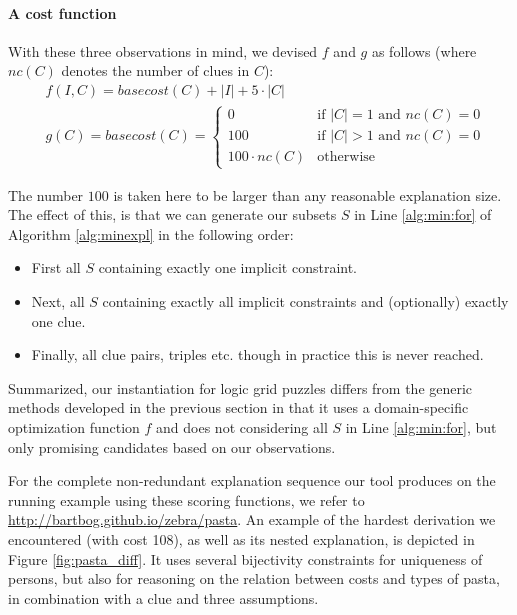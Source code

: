 \paragraph{A cost function}
With these three observations in mind, we devised $f$ and $g$ as follows (where $nc(C)$ denotes the number of clues in $C$): \label{sec:cost}
\begin{align*}&f(I,C) = basecost(C) + |I| + 5\cdot|C|\\
&g(C) = basecost(C) = \left\{\begin{array}{ll}
                               0 & \text{if $|C|=1$ and $nc(C) = 0$}\\
                               100 & \text{if $|C|>1$ and $nc(C)=0$}\\
                               100\cdot nc(C) & \text{otherwise}
                              \end{array}\right.
                              \end{align*}
                              
The number $100$ is taken here to be larger than any reasonable explanation size. 
The effect of this,  is that we can generate our subsets $S$ in Line \ref{alg:min:for}
 of Algorithm \ref{alg:minexpl} in the following order:
\begin{itemize}
 \item First all $S$ containing exactly one implicit constraint.
 \item Next, all $S$ containing exactly all implicit constraints and (optionally) exactly one clue.
 \item Finally, all clue pairs, triples etc. though in practice this is never reached.
\end{itemize}
Summarized, our instantiation for logic grid puzzles differs from the generic methods developed in the previous section in that it uses a domain-specific optimization function $f$ and does not considering all $S$ in Line \ref{alg:min:for}, but only promising candidates based on our observations.

For the complete non-redundant explanation sequence our tool produces on the running example using these scoring functions, we refer to \url{http://bartbog.github.io/zebra/pasta}. An example of the hardest derivation we encountered (with cost 108), as well as its nested explanation, is depicted in Figure \ref{fig:pasta_diff}. It uses several bijectivity constraints for uniqueness of persons, but also for reasoning on the relation between costs and types of pasta, in combination with a clue and three assumptions.

